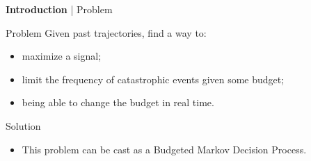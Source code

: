 \documentclass{beamer}
\begin{document}
    \begin{frame}{\textbf{Introduction} | Problem}
        \begin{block}{Problem}
            Given past trajectories, find a way to:
            \begin{itemize}
                \pause\item maximize a signal;
                \pause\item limit the frequency of catastrophic events given some budget;
                \pause\item being able to change the budget in real time.
            \end{itemize}

        \end{block}

        \pause
        \begin{block}{Solution}
            \begin{itemize}
                \item This problem can be cast as a Budgeted Markov Decision Process.
            \end{itemize}
        \end{block}
    \end{frame}
\end{document}

